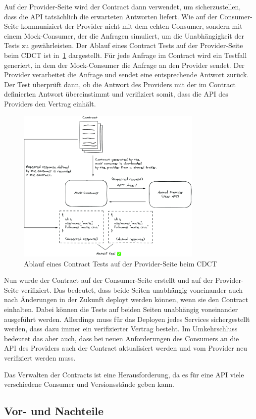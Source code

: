 Auf der Provider-Seite wird der Contract dann verwendet, um sicherzustellen, dass die \gls{API} tatsächlich die erwarteten Antworten liefert.
Wie auf der Consumer-Seite kommuniziert der Provider nicht mit dem echten Consumer, sondern mit einem \gls{Mock}-Consumer, der die Anfragen simuliert, um die Unabhängigkeit der Tests zu gewährleisten.
Der Ablauf eines Contract Tests auf der Provider-Seite beim \gls{CDCT} ist in~\cref{fig:cdct-provider-side} dargestellt.
Für jede Anfrage im Contract wird ein Testfall generiert, in dem der \gls{Mock}-Consumer die Anfrage an den Provider sendet.
Der Provider verarbeitet die Anfrage und sendet eine entsprechende Antwort zurück.
Der Test überprüft dann, ob die Antwort des Providers mit der im Contract definierten Antwort übereinstimmt und verifiziert somit, dass die \gls{API} des Providers den Vertrag einhält.

\begin{figure}[ht]
    \centering
    \includegraphics[width=0.8\textwidth]{figures/provider-side}
    \caption{Ablauf eines Contract Tests auf der Provider-Seite beim \gls{CDCT}}
    \label{fig:cdct-provider-side}
\end{figure}

Nun wurde der Contract auf der Consumer-Seite erstellt und auf der Provider-Seite verifiziert.
Das bedeutet, dass beide Seiten unabhängig voneinander auch nach Änderungen in der Zukunft deployt werden können, wenn sie den Contract einhalten.
Dabei können die Tests auf beiden Seiten unabhängig voneinander ausgeführt werden.
Allerdings muss für das Deployen jedes Services sichergestellt werden, dass dazu immer ein verifizierter Vertrag besteht.
Im Umkehrschluss bedeutet das aber auch, dass bei neuen Anforderungen des Consumers an die \gls{API} des Providers auch der Contract aktualisiert werden und vom Provider neu verifiziert werden muss.

Das Verwalten der Contracts ist eine Herausforderung, da es für eine API viele verschiedene Consumer und Versionsstände geben kann.


\subsection{Vor- und Nachteile}\label{subsec:foundation_contracttesting_proscons}
